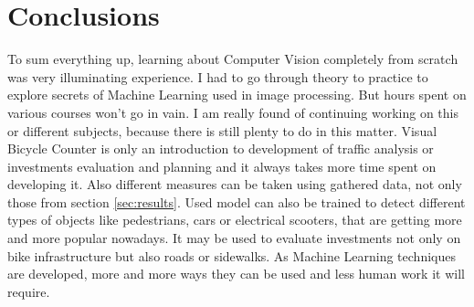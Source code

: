 \chapter{Conclusions}
\label{cha:conclusions}
To sum everything up, learning about Computer Vision completely from scratch was very illuminating experience. I had to go through theory to practice to explore secrets of Machine Learning used in image processing. But hours spent on various courses won't go in vain. I am really found of continuing working on this or different subjects, because there is still plenty to do in this matter. Visual Bicycle Counter is only an introduction to development of traffic analysis or investments evaluation and planning and it always takes more time spent on developing it. Also different measures can be taken using gathered data, not only those from section \ref{sec:results}. Used model can also be trained to detect different types of objects like pedestrians, cars or electrical scooters, that are getting more and more popular nowadays. It may be used to evaluate investments not only on bike infrastructure but also roads or sidewalks. As Machine Learning techniques are developed, more and more ways they can be used and less human work it will require.